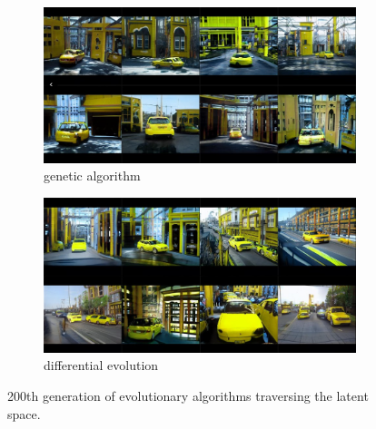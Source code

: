 \documentclass[11pt,a4paper,openany]{book}
\begin{document}
\begin{figure}[H]
\centering
\begin{subfigure}[b]{1.0\textwidth}
   \includegraphics[width=1\linewidth]{GA_yellowcar_200.PNG}
   \caption{genetic algorithm}
   \label{fig:Ng1} 
\end{subfigure}

\begin{subfigure}[b]{1.0\textwidth}
   \includegraphics[width=1\linewidth]{DE_yellowcar_200.PNG}
   \caption{differential evolution}
   \label{fig:Ng2}
\end{subfigure}

\caption[Two numerical solutions]{200th generation of evolutionary algorithms traversing the latent space.}
\end{figure}
\end{document}
